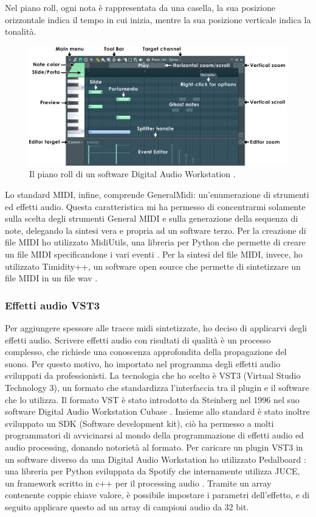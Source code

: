 Nel piano roll, ogni nota è rappresentata da una casella, la sua posizione orizzontale indica il tempo in cui inizia, mentre la sua posizione verticale indica la tonalità.
\begin{figure}[H]
    \includegraphics[width=\linewidth,scale=0.2]{img/pianoroll.png}
    \caption{Il piano roll di un software Digital Audio Workstation \cite{pianoroll_img}.}
    \label{fig:pianoroll}
\end{figure}
Lo standard MIDI, infine, comprende GeneralMidi: un'enumerazione di strumenti ed effetti audio.
Questa caratteristica mi ha permesso di concentrarmi solamente sulla scelta degli strumenti General MIDI e sulla generazione della sequenza di note, delegando la sintesi vera e propria ad un software terzo.
Per la creazione di file MIDI ho utilizzato MidiUtils, una libreria per Python che permette di creare un file MIDI specificandone i vari eventi \cite{midiutil}.
Per la sintesi del file MIDI, invece, ho utilizzato Timidity++, un software open source che permette di sintetizzare un file MIDI in un file wav \cite{timidity}.
\subsubsection{Effetti audio VST3}
Per aggiungere spessore alle tracce midi sintetizzate, ho deciso di applicarvi degli effetti audio.
Scrivere effetti audio con risultati di qualità è un processo complesso, che richiede una conoscenza approfondita della propagazione del suono.
Per questo motivo, ho importato nel programma degli effetti audio sviluppati da professionisti.
La tecnologia che ho scelto è VST3 (Virtual Studio Technology 3), un formato che standardizza l'interfaccia tra il plugin e il software che lo utilizza.
Il formato VST è stato introdotto da Steinberg nel 1996 nel suo software Digital Audio Workstation Cubase \cite{vst3}. Insieme allo standard è stato inoltre sviluppato un SDK (Software development kit), ciò ha permesso a molti programmatori
di avvicinarsi al mondo della programmazione di effetti audio ed audio processing, donando notorietà al formato.
Per caricare un plugin VST3 in un software diverso da una Digital Audio Workstation ho utilizzato Pedalboard \cite{pedalboard}: una libreria per Python sviluppata da Spotify che internamente utilizza JUCE, un framework scritto in c++ per il processing audio \cite{juce}.
Tramite un array contenente coppie chiave valore, è possibile impostare i parametri dell'effetto, e di seguito applicare questo ad un array di campioni audio da 32 bit.

